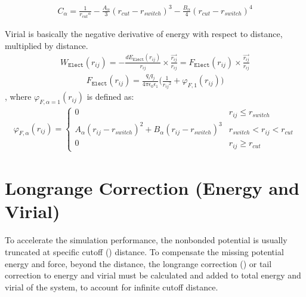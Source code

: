 \documentclass[letterpaper,10pt,english]{sphinxmanual}
\begin{document}
\begin{description}
\begin{equation*}
\begin{split}C_{\alpha} =  \frac{1}{{r_{cut}}^{\alpha}} -\frac{A_{\alpha}}{3} (r_{cut} - r_{switch})^3 -\frac{B_{\alpha}}{4} (r_{cut} - r_{switch})^4\end{split}
\end{equation*}
\item[{\sphinxcode{\sphinxupquote{Virial Calculation}}}] \leavevmode
Virial is basically the negative derivative of energy with respect to distance, multiplied by distance.
\begin{equation*}
\begin{split}W_{\texttt{Elect}}(r_{ij}) = -\frac{dE_{\texttt{Elect}}(r_{ij})}{r_{ij}}\times \frac{\overrightarrow{r_{ij}}}{{r_{ij}}} = F_{\texttt{Elect}}(r_{ij}) \times \frac{\overrightarrow{r_{ij}}}{{r_{ij}}}\end{split}
\end{equation*}\begin{equation*}
\begin{split}F_{\texttt{Elect}}(r_{ij})=\frac{q_iq_j}{4\pi\epsilon_0\epsilon_1}\bigg(\frac{1}{{r_{ij}}^2}+\varphi_{F, 1}(r_{ij})\bigg)\end{split}
\end{equation*}
, where \(\varphi_{F, \alpha = 1} (r_{ij})\) is defined as:
\begin{equation*}
\begin{split}\varphi_{F, \alpha}(r_{ij}) =
\begin{cases}
  0 & r_{ij} \leq r_{switch} \\
  A_{\alpha} (r_{ij} - r_{switch})^2 + B_{\alpha} (r_{ij} - r_{switch})^3 & r_{switch} < r_{ij} < r_{cut} \\
  0 & r_{ij} \geq r_{cut}
\end{cases}\end{split}
\end{equation*}
\end{description}


\chapter{Long\sphinxhyphen{}range Correction (Energy and Virial)}
\label{\detokenize{long_range_correction:long-range-correction-energy-and-virial}}\label{\detokenize{long_range_correction::doc}}
To accelerate the simulation performance, the nonbonded potential is usually truncated at specific cut\sphinxhyphen{}off () distance.
To compensate the missing potential energy and force, beyond the  distance, the long\sphinxhyphen{}range correction () or tail correction to energy and virial must be
calculated and added to total energy and virial of the system, to account for infinite cutoff distance.
\end{document}
